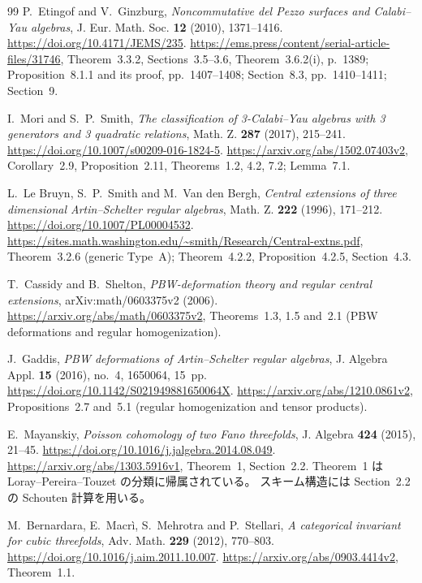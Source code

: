 \begin{thebibliography}{99}
P.~Etingof and V.~Ginzburg,
\emph{Noncommutative del Pezzo surfaces and Calabi--Yau algebras},
J. Eur. Math. Soc. \textbf{12} (2010), 1371--1416.
\url{https://doi.org/10.4171/JEMS/235}.
\url{https://ems.press/content/serial-article-files/31746},
Theorem~3.3.2, Sections~3.5--3.6, Theorem~3.6.2(i), p.~1389;
Proposition~8.1.1 and its proof, pp.~1407--1408; Section~8.3, pp.~1410--1411; Section~9.

I.~Mori and S.~P.~Smith,
\emph{The classification of 3-Calabi--Yau algebras with 3 generators and 3 quadratic relations},
Math. Z. \textbf{287} (2017), 215--241.
\url{https://doi.org/10.1007/s00209-016-1824-5}.
\url{https://arxiv.org/abs/1502.07403v2}, Corollary~2.9, Proposition~2.11,
Theorems~1.2, 4.2, 7.2; Lemma~7.1.

L.~Le Bruyn, S.~P.~Smith and M.~Van den Bergh,
\emph{Central extensions of three dimensional Artin--Schelter regular algebras},
Math. Z. \textbf{222} (1996), 171--212.
\url{https://doi.org/10.1007/PL00004532}.
\url{https://sites.math.washington.edu/~smith/Research/Central-extns.pdf},
Theorem~3.2.6 (generic Type~A); Theorem~4.2.2, Proposition~4.2.5, Section~4.3.

T.~Cassidy and B.~Shelton,
\emph{PBW-deformation theory and regular central extensions},
arXiv:math/0603375v2 (2006).
\url{https://arxiv.org/abs/math/0603375v2},
Theorems~1.3, 1.5 and~2.1 (PBW deformations and regular homogenization).

J.~Gaddis,
\emph{PBW deformations of Artin--Schelter regular algebras},
J. Algebra Appl. \textbf{15} (2016), no.~4, 1650064, 15~pp.
\url{https://doi.org/10.1142/S021949881650064X}.
\url{https://arxiv.org/abs/1210.0861v2},
Propositions~2.7 and~5.1 (regular homogenization and tensor products).

E.~Mayanskiy,
\emph{Poisson cohomology of two Fano threefolds},
J. Algebra \textbf{424} (2015), 21--45.
\url{https://doi.org/10.1016/j.jalgebra.2014.08.049}.
\url{https://arxiv.org/abs/1303.5916v1}, Theorem~1, Section~2.2.
Theorem~1 は Loray--Pereira--Touzet の分類に帰属されている。
スキーム構造には Section~2.2 の Schouten 計算を用いる。

M.~Bernardara, E.~Macr\`i, S.~Mehrotra and P.~Stellari,
\emph{A categorical invariant for cubic threefolds},
Adv. Math. \textbf{229} (2012), 770--803.
\url{https://doi.org/10.1016/j.aim.2011.10.007}.
\url{https://arxiv.org/abs/0903.4414v2}, Theorem~1.1.


\end{thebibliography}
